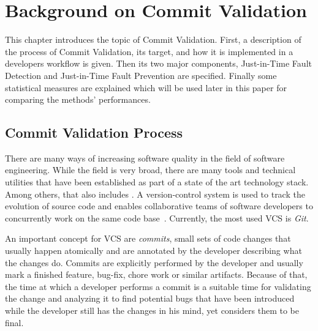 

\section{Background on Commit Validation}
\label{sec:background}

This chapter introduces the topic of Commit Validation. 
First, a description of the process of Commit Validation, its target, and how it is implemented in a developers workflow is given.
Then its two major components, Just-in-Time Fault Detection and Just-in-Time Fault Prevention are specified. Finally some statistical measures are explained which will be used later in this paper for comparing the methods' performances.


\subsection{Commit Validation Process}
\label{sec:cvprocess}



There are many ways of increasing software quality in the field of software engineering. While the field is very broad, there are many tools and technical utilities that have been established as part of a state of the art technology stack. Among others, that also includes . A version-control system is used to track the evolution of source code and enables collaborative teams of software developers to concurrently work on the same code base~\cite{Chacon:2014:PG:2695634}. Currently, the most used VCS is \textit{Git}. %

An important concept for VCS are \textit{commits}, small sets of code changes that usually happen atomically and are annotated by the developer describing what the changes do. Commits are explicitly performed by the developer and usually mark a finished feature, bug-fix, chore work or similar artifacts. Because of that, the time at which a developer performs a commit is a suitable time for validating the change and analyzing it to find potential bugs that have been introduced while the developer still has the changes in his mind, yet considers them to be final. %

